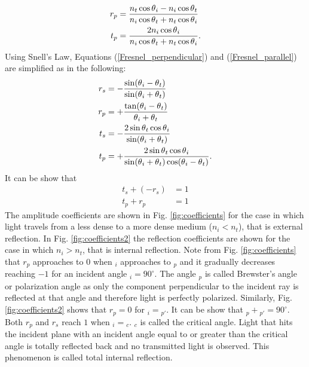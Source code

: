 \begin{equation}\label{Fresnel_parallel}
\begin{split}
r_{p} & = \frac{n_t\cos\mbox{$\theta$}_i-n_i \cos\mbox{$\theta$}_t}{n_i \cos\mbox{$\theta$}_t+n_t\cos\mbox{$\theta$}_i}\\
t_{p} & =  \frac{2n_i\cos\mbox{$\theta$}_i}{n_i\cos\mbox{$\theta$}_t+n_t\cos\mbox{$\theta$}_i}.
\end{split}
\end{equation}
Using Snell's Law, Equations (\ref{Fresnel_perpendicular}) and (\ref{Fresnel_parallel}) are simplified as in the following:
\begin{equation} \label{simple_Fresnel}
\begin{split}
r_{s} & = -\frac{\sin(\mbox{$\theta$}_i-\mbox{$\theta$}_t)}{\sin(\mbox{$\theta$}_i+\mbox{$\theta$}_t)}\\
r_{p} & =  +\frac{\tan(\mbox{$\theta$}_i-\mbox{$\theta$}_t)}{\mbox{$\theta$}_i+\mbox{$\theta$}_t}\\
t_{s} & = -\frac{2\sin \mbox{$\theta$}_t \cos \mbox{$\theta$}_i}{\sin(\mbox{$\theta$}_i+\mbox{$\theta$}_t)}\\
t_{p} & = +\frac{2\sin \mbox{$\theta$}_t \cos \mbox{$\theta$}_i}{\sin(\mbox{$\theta$}_i+\mbox{$\theta$}_t)\cos(\mbox{$\theta$}_i- \mbox{$\theta$}_t)}.
\end{split}
\end{equation}
It can be show that
 \begin{equation}
\begin{split}
t_s+(-r_s) &= 1 \\
t_p+r_p &=  1
\end{split}
\end{equation}
The amplitude coefficients are shown in Fig. \ref{fig:coefficients} for the case in which light travels from a less dense to a more dense medium ($n_i<n_t$), that is external reflection. 
In Fig. \ref{fig:coefficients2} the reflection coefficients are shown for the case in which $n_i>n_t$, that is internal reflection. Note from Fig. \ref{fig:coefficients} that $r_p$ approaches to $0$ when \myangle$_i$ approaches to \myangle$_p$ and it gradually decreases reaching $-1$ for an incident angle \myangle$_i=90^\circ$. The angle \myangle$_p$ is called Brewster's angle or polarization angle as only the component perpendicular to the incident ray is reflected at that angle and therefore light is perfectly polarized. Similarly, Fig. \ref{fig:coefficients2} shows that $r_p=0$ for \myangle$_i= $\myangle$_{p\prime}$. It can be show that \myangle$_p+ $\myangle$_{p\prime}= 90^\circ$. Both $r_p$ and $r_s$ reach $1$ when \myangle$_i= $\myangle$_c$. \myangle$_c$ is called the critical angle. Light that hits the incident plane with an incident angle equal to or greater than the critical angle is totally reflected back and no transmitted light is observed. This phenomenon is called total internal reflection. 
